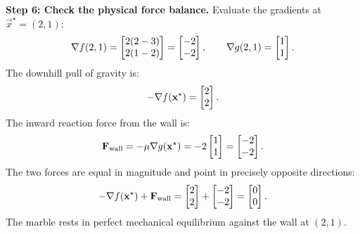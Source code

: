 \begin{example}
\textbf{Step 6: Check the physical force balance.}
Evaluate the gradients at $\vec{x}^\star = (2, 1)$:
\[
  \nabla f(2, 1) = \begin{bmatrix}2(2-3) \\ 2(1-2)\end{bmatrix} = \begin{bmatrix}-2 \\ -2\end{bmatrix}, \qquad \nabla g(2, 1) = \begin{bmatrix}1 \\ 1\end{bmatrix}.
\]
The downhill pull of gravity is:
\[
  -\nabla f(\mathbf{x}^\star) = \begin{bmatrix}2 \\ 2\end{bmatrix}.
\]
The inward reaction force from the wall is:
\[
  \mathbf{F}_{\text{wall}} = -\mu \nabla g(\mathbf{x}^\star) = -2 \begin{bmatrix}1 \\ 1\end{bmatrix} = \begin{bmatrix}-2 \\ -2\end{bmatrix}.
\]
The two forces are equal in magnitude and point in precisely opposite directions:
\[
  -\nabla f(\mathbf{x}^\star) + \mathbf{F}_{\text{wall}} = \begin{bmatrix}2 \\ 2\end{bmatrix} + \begin{bmatrix}-2 \\ -2\end{bmatrix} = \begin{bmatrix}0 \\ 0\end{bmatrix}.
\]
The marble rests in perfect mechanical equilibrium against the wall at $(2, 1)$.
\end{example}

